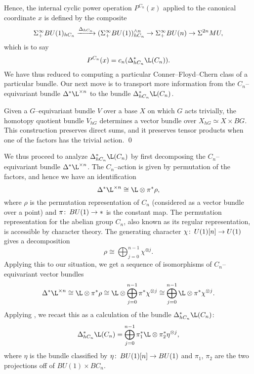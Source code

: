 Hence, the internal cyclic power operation \(P^{C_n}(x)\) applied to the canonical coordinate \(x\) is defined by the composite \[\Sigma^\infty_+ BU(1)_{hC_n} \xrightarrow{\Delta_{hC_n}} (\Sigma^\infty_+ BU(1))^{\wedge n}_{hC_n} \to \Sigma^\infty_+ BU(n) \to \Sigma^{2n} MU,\] which is to say \[P^{C_n}(x) = c_n(\Delta_{hC_n}^* \L(C_n)).\]  We have thus reduced to computing a particular Conner--Floyd--Chern class of a particular bundle.  Our next move is to transport more information from the \(C_n\)--equivariant bundle \(\Delta^* \L^{\times n}\) to the bundle \(\Delta_{hC_n}^* \L(C_n)\).

\begin{lemma}\label{GEquivBundlesVsBundlesOverBG}
Given a \(G\)--equivariant bundle \(V\) over a base \(X\) on which \(G\) acts trivially, the homotopy quotient bundle \(V_{hG}\) determines a vector bundle over \(X_{hG} \simeq X \times BG\).  This construction preserves direct sums, and it preserves tensor products when one of the factors has the trivial action. \pushQED\qed\qedhere\popQED
\end{lemma}

We thus proceed to analyze \(\Delta^*_{hC_n} \L(C_n)\) by first decomposing the \(C_n\)--equivariant bundle \(\Delta^* \L^{\times n}\).  The \(C_n\)--action is given by permutation of the factors, and hence we have an identification \[\Delta^* \L^{\times n} \cong \L \otimes \pi^* \rho,\] where \(\rho\) is the permutation representation of \(C_n\) (considered as a vector bundle over a point) and \(\pi\colon\thinspace BU(1) \to *\) is the constant map.  The permutation representation for the abelian group \(C_n\), also known as its regular representation, is accessible by character theory.  The generating character \(\chi\colon\thinspace U(1)[n] \to U(1)\) gives a decomposition \[\rho \cong \bigoplus_{j=0}^{n-1} \chi^{\otimes j}.\]  Applying this to our situation, we get a sequence of isomorphisms of \(C_n\)--equivariant vector bundles \[\Delta^* \L^{\times n} \cong \L \otimes \pi^* \rho \cong \L \otimes \bigoplus_{j=0}^{n-1} \pi^* \chi^{\otimes j} \cong \bigoplus_{j=0}^{n-1} \L \otimes \pi^* \chi^{\otimes j}.\]  Applying , we recast this as a calculation of the bundle \(\Delta_{hC_n}^* \L(C_n)\): \[\Delta_{hC_n}^* \L(C_n) = \bigoplus_{j=0}^{n-1} \pi_1^* \L \otimes \pi_2^* \eta^{\otimes j},\] where \(\eta\) is the bundle classified by \(\eta\colon\thinspace BU(1)[n] \to BU(1)\) and \(\pi_1\), \(\pi_2\) are the two projections off of \(BU(1) \times BC_n\).

